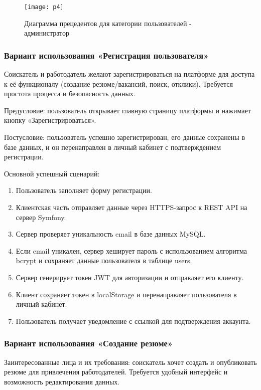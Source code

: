\begin{figure}[H]
	\centering
	\texttt{[image: p4]}
	\caption{Диаграмма прецедентов для категории пользователей - администратор}
	\label{p4:image}
\end{figure}

\subsubsection{Вариант использования «Регистрация пользователя»}
Соискатель и работодатель желают зарегистрироваться на платформе для доступа к её функционалу (создание резюме/вакансий, поиск, отклики). Требуется простота процесса и безопасность данных.

Предусловие: пользователь открывает главную страницу платформы и нажимает кнопку «Зарегистрироваться».

Постусловие: пользователь успешно зарегистрирован, его данные сохранены в базе данных, и он перенаправлен в личный кабинет с подтверждением регистрации.

Основной успешный сценарий:

\begin{enumerate}
	\item Пользователь заполняет форму регистрации.
	\item Клиентская часть отправляет данные через HTTPS-запрос к REST API на сервер Symfony.
	\item Сервер проверяет уникальность email в базе данных MySQL.
	\item Если email уникален, сервер хеширует пароль с использованием алгоритма bcrypt и сохраняет данные пользователя в таблице users.
	\item Сервер генерирует токен JWT для авторизации и отправляет его клиенту.
	\item Клиент сохраняет токен в localStorage и перенаправляет пользователя в личный кабинет.
	\item Пользователь получает уведомление с ссылкой для подтверждения аккаунта.
\end{enumerate}

\subsubsection{Вариант использования «Создание резюме»}
Заинтересованные лица и их требования: соискатель хочет создать и опубликовать резюме для привлечения работодателей. Требуется удобный интерфейс и возможность редактирования данных.

